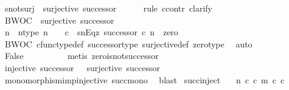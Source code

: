 \begin{isabellebody}
\ s{\isacharunderscore}{\kern0pt}not{\isacharunderscore}{\kern0pt}surj{\isacharcolon}{\kern0pt}\ {\isachardoublequoteopen}{\isasymnot}\ surjective\ successor{\isachardoublequoteclose}\isanewline
\ \ \ \ \isamarkupfalse%
\ {\isacharparenleft}{\kern0pt}rule\ ccontr{\isacharcomma}{\kern0pt}\ clarify{\isacharparenright}{\kern0pt}\isanewline
\ \ \ \ \ \ \isamarkupfalse%
\ BWOC\ {\isacharcolon}{\kern0pt}\ {\isachardoublequoteopen}surjective\ successor{\isachardoublequoteclose}\isanewline
\ \ \ \ \ \ \isamarkupfalse%
\ n\ \ n{\isacharunderscore}{\kern0pt}type{\isacharcolon}{\kern0pt}\ {\isachardoublequoteopen}n\ {\isacharcolon}{\kern0pt}\ {\isasymone}\ {\isasymrightarrow}\ {\isasymnat}\isactrlsub c{\isachardoublequoteclose}\ \ snEqz{\isacharcolon}{\kern0pt}\ {\isachardoublequoteopen}successor\ {\isasymcirc}\isactrlsub c\ n\ {\isacharequal}{\kern0pt}\ zero{\isachardoublequoteclose}\isanewline
\ \ \ \ \ \ \ \ \isamarkupfalse%
\ BWOC\ cfunc{\isacharunderscore}{\kern0pt}type{\isacharunderscore}{\kern0pt}def\ successor{\isacharunderscore}{\kern0pt}type\ surjective{\isacharunderscore}{\kern0pt}def\ zero{\isacharunderscore}{\kern0pt}type\ \isamarkupfalse%
\ auto\isanewline
\ \ \ \ \ \ \isamarkupfalse%
\ \isamarkupfalse%
\ False\isanewline
\ \ \ \ \ \ \ \ \isamarkupfalse%
\ {\isacharparenleft}{\kern0pt}metis\ zero{\isacharunderscore}{\kern0pt}is{\isacharunderscore}{\kern0pt}not{\isacharunderscore}{\kern0pt}successor{\isacharparenright}{\kern0pt}\isanewline
\ \ \ \ \isamarkupfalse%
\isanewline
\ \ \isamarkupfalse%
\ \isamarkupfalse%
\ {\isachardoublequoteopen}injective\ successor\ {\isasymand}\ {\isasymnot}\ surjective\ successor{\isachardoublequoteclose}\isanewline
\ \ \ \ \isamarkupfalse%
\ monomorphism{\isacharunderscore}{\kern0pt}imp{\isacharunderscore}{\kern0pt}injective\ succ{\isacharunderscore}{\kern0pt}mono\ \isamarkupfalse%
\ blast\isanewline
{}\isamarkupfalse%
%
\endisatagproof
{\isafoldproof}%
%
\isadelimproof
\isanewline
%
\endisadelimproof
\isanewline
{}\isamarkupfalse%
\ succ{\isacharunderscore}{\kern0pt}inject{\isacharcolon}{\kern0pt}\isanewline
\ \ \ {\isachardoublequoteopen}n\ {\isasymin}\isactrlsub c\ {\isasymnat}\isactrlsub c{\isachardoublequoteclose}\ {\isachardoublequoteopen}m\ {\isasymin}\isactrlsub c\ {\isasymnat}\isactrlsub c{\isachardoublequoteclose}\isanewline

\end{isabellebody}
